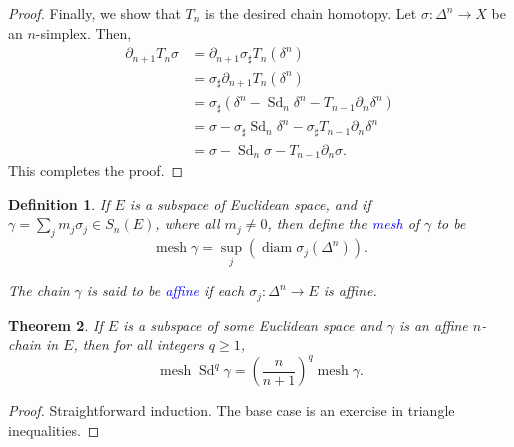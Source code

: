 \documentclass[10pt]{article}
\theoremstyle{thmstyle}
\newtheorem{theorem}{Theorem}[section]
\theoremstyle{defstyle}
\newtheorem{definition}[theorem]{Definition}
\newcommand{\define}[1]{\textcolor{blue}{\textit{#1}}}
\renewcommand{\ge}{\geqslant}
\newcommand{\Sd}{\operatorname{Sd}}
\newcommand{\mesh}{\operatorname{mesh}}
\newcommand{\diam}{\operatorname{diam}}
\begin{document}
\begin{proof}
    Finally, we show that $T_n$ is the desired chain homotopy. Let $\sigma:\Delta^n\to X$ be an $n$-simplex. Then, 
    \begin{align*}
        \partial_{n + 1}T_n\sigma &= \partial_{n + 1}\sigma_\sharp T_n(\delta^n)\\
        &= \sigma_\sharp\partial_{n + 1}T_n(\delta^n)\\
        &= \sigma_\sharp\left(\delta^n - \Sd_n\delta^n - T_{n - 1}\partial_n\delta^n\right)\\
        &= \sigma - \sigma_\sharp\Sd_n\delta^n - \sigma_\sharp T_{n - 1}\partial_n\delta^n\\
        &= \sigma - \Sd_n\sigma - T_{n - 1}\partial_n\sigma.
    \end{align*}
    This completes the proof.
\end{proof}

\begin{definition}
    If $E$ is a subspace of Euclidean space, and if $\gamma = \sum_j m_j\sigma_j\in S_n(E)$, where all $m_j\ne 0$, then define the \define{mesh} of $\gamma$ to be 
    \begin{equation*}
        \mesh\gamma = \sup_j\left(\diam\sigma_j(\Delta^n)\right).
    \end{equation*}

    The chain $\gamma$ is said to be \define{affine} if each $\sigma_j:\Delta^n\to E$ is affine.
\end{definition}

\begin{theorem}
    If $E$ is a subspace of some Euclidean space and $\gamma$ is an affine $n$-chain in $E$, then for all integers $q\ge 1$, 
    \begin{equation*}
        \mesh\Sd^q\gamma = \left(\frac{n}{n + 1}\right)^q\mesh\gamma.
    \end{equation*}
\end{theorem}
\begin{proof}
    Straightforward induction. The base case is an exercise in triangle inequalities.
\end{proof}
\end{document}
